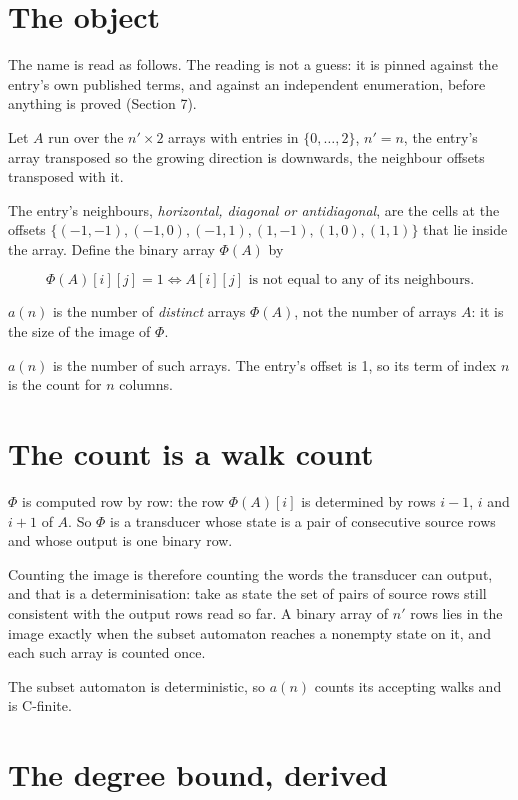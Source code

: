 \documentclass[11pt]{article}
\theoremstyle{definition}
\begin{document}
\section{The object}

The name is read as follows. The reading is not a guess: it is pinned against the entry's own published terms, and against an independent enumeration, before anything is proved (Section 7).

Let $A$ run over the $n' \times 2$ arrays with entries in $\{0,\dots,2\}$, $n' = n$, the entry's array transposed so the growing direction is downwards, the neighbour offsets transposed with it.

The entry's neighbours, {\itshape horizontal, diagonal or antidiagonal}, are the cells at the offsets $\{(-1,-1), (-1,0), (-1,1), (1,-1), (1,0), (1,1)\}$ that lie inside the array. Define the binary array $\Phi(A)$ by

\[\Phi(A)[i][j] = 1 \iff A[i][j] \text{ is not equal to any of its neighbours}.\]

$a(n)$ is the number of {\itshape distinct} arrays $\Phi(A)$, not the number of arrays $A$: it is the size of the image of $\Phi$.

$a(n)$ is the number of such arrays. The entry's offset is 1, so its term of index $n$ is the count for $n$ columns.

\section{The count is a walk count}

$\Phi$ is computed row by row: the row $\Phi(A)[i]$ is determined by rows $i-1$, $i$ and $i+1$ of $A$. So $\Phi$ is a transducer whose state is a pair of consecutive source rows and whose output is one binary row.

Counting the image is therefore counting the words the transducer can output, and that is a determinisation: take as state the set of pairs of source rows still consistent with the output rows read so far. A binary array of $n'$ rows lies in the image exactly when the subset automaton reaches a nonempty state on it, and each such array is counted once.

The subset automaton is deterministic, so $a(n)$ counts its accepting walks and is C-finite.

\section{The degree bound, derived}
\end{document}

